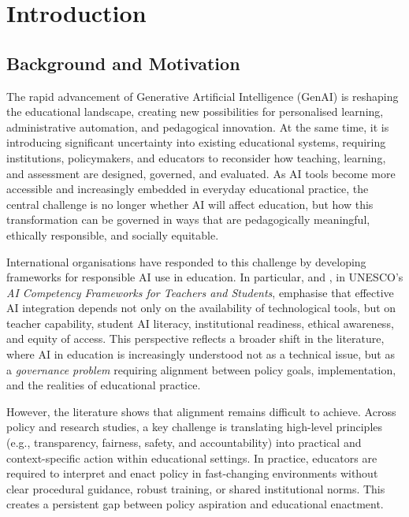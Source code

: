 \chapter{Introduction}
\label{chpt:intro}


\section{Background and Motivation}

The rapid advancement of Generative Artificial Intelligence (GenAI) is reshaping the
educational landscape, creating new possibilities for personalised learning,
administrative automation, and pedagogical innovation. At the same time, it is
introducing significant uncertainty into existing educational systems, requiring
institutions, policymakers, and educators to reconsider how teaching, learning, and
assessment are designed, governed, and evaluated. As AI tools become more accessible
and increasingly embedded in everyday educational practice, the central challenge is
no longer whether AI will affect education, but how this transformation can be
governed in ways that are pedagogically meaningful, ethically responsible, and
socially equitable.

International organisations have responded to this challenge by developing frameworks
for responsible AI use in education. In particular, \cite{miao2024aiteachers} and
\cite{miao2024aistudents}, in UNESCO's \textit{AI Competency Frameworks for Teachers
and Students}, emphasise that effective AI integration depends not only on the
availability of technological tools, but on teacher capability, student AI literacy,
institutional readiness, ethical awareness, and equity of access. This perspective
reflects a broader shift in the literature, where AI in education is increasingly
understood not as a technical issue, but as a \textit{governance problem} requiring
alignment between policy goals, implementation, and the realities of educational
practice.

However, the literature shows that alignment remains difficult to
achieve. Across policy and research studies, a key challenge is translating
high-level principles (e.g., transparency, fairness, safety, and
accountability) into practical and context-specific action within educational
settings. In practice, educators are required to interpret and enact policy in
fast-changing environments without clear procedural guidance, robust training, or
shared institutional norms. This creates a persistent gap between policy aspiration
and educational enactment.

